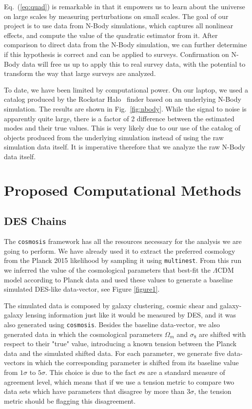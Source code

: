 \documentclass[12pt]{article}
\newcommand{\rf}[1]{\ref{fig:#1}}
\newcommand{\ec}[1]{Eq.~(\ref{eq:#1})}
\begin{document}
\begin{small}
\ec{quad} is remarkable in that it empowers us to learn about the universe on large scales by measuring perturbations on small scales. 
The goal of our project is to use data from N-Body simulations, which captures all nonlinear effects, and compute the value of the quadratic estimator from it. After comparison to direct data from the N-Body simulation, we can further determine if this hypothesis is correct and can be applied to surveys. Confirmation on N-Body data will free us up to apply this to real survey data, with the potential to transform the way that large surveys are analyzed.


To date, we have been limited by computational power. On our laptop, we used a catalog produced by the Rockstar Halo~\cite{2013ApJ...762..109B} finder based on an underlying N-Body simulation. The results are shown in Fig.~\rf{nbody}. While the signal to noise is apparently quite large, there is a factor of 2 difference between the estimated modes and their true values. This is very likely due to our use of the catalog of objects produced from the underlying simulation instead of using the raw simulation data itself. It is imperative therefore that we analyze the raw N-Body data itself.


\section{Proposed Computational Methods}
\subsection{DES Chains}

The {\tt cosmosis} framework has all the resources necessary for the analysis we are going to perform. We have already used it to extract the preferred cosmology from the Planck 2015 likelihood  by sampling it using {\tt multinest}. From this run we inferred the value of the cosmological parameters that best-fit the $\Lambda$CDM model according to Planck data and used these values to generate a baseline simulated DES-like data-vector, see Figure \ref{figure1}.


The simulated data is composed by galaxy clustering, cosmic shear and galaxy-galaxy lensing information just like it would be measured by DES, and it was also generated using {\tt cosmosis}. Besides the baseline data-vector, we also generated data in which the cosmological parameters $\Omega_m$ and $\sigma_8$ are shifted with respect to their "true" value, introducing a known tension between the Planck data and the simulated shifted data. For each parameter, we generate five data-vectors in which the corresponding parameter is shifted from its baseline value from $1\sigma$ to $5\sigma$. This choice is due to the fact $\sigma$s are a standard measure of agreement level, which means that if we use a tension metric to compare two data sets which have parameters that disagree by more than $3\sigma$, the tension metric should be flagging this disagreement. 


\end{small}
\end{document}
